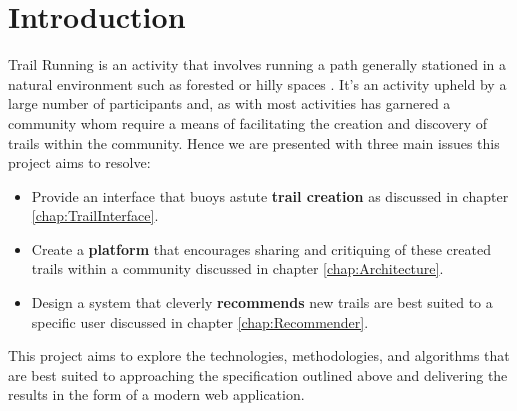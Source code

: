 \chapter{Introduction} \label{chap:Intro}
Trail Running is an activity that involves running a path generally stationed in a natural environment such as forested or hilly spaces \cite{wiki:TrailRunning}. It's an activity upheld by a large number of participants and, as with most activities has garnered a community whom require a means of facilitating the creation and discovery of trails within the community. Hence we are presented with three main issues this project aims to resolve:
\begin{itemize}
    \item Provide an interface that buoys astute \textbf{trail creation} as discussed in chapter \ref{chap:TrailInterface}.
    \item Create a \textbf{platform} that encourages sharing and critiquing of these created trails within a community discussed in chapter \ref{chap:Architecture}.
    \item Design a system that cleverly \textbf{recommends} new trails are best suited to a specific user discussed in chapter \ref{chap:Recommender}.
\end{itemize}
This project aims to explore the technologies, methodologies, and algorithms that are best suited to approaching the specification outlined above and delivering the results in the form of a modern web application.


